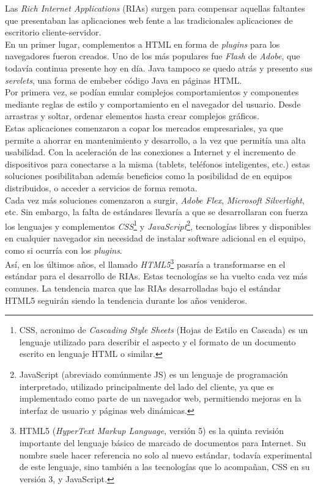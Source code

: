 Las \emph{Rich Internet Applications} (RIAs) surgen para compensar aquellas faltantes que
presentaban las aplicaciones web fente a las tradicionales aplicaciones de escritorio
cliente-servidor.\\
En un primer lugar, complementos a HTML en forma de \emph{plugins} para los navegadores
fueron creados. Uno de los más populares fue \emph{Flash} de \emph{Adobe}, que todavía
continua presente hoy en día. Java tampoco se quedo atrás y presento sus \emph{servlets},
una forma de embeber código Java en páginas HTML.\\
Por primera vez, se podían emular complejos comportamientos y componentes mediante
reglas de estilo y comportamiento en el navegador del usuario. Desde arrastras y soltar,
ordenar elementos hasta crear complejos gráficos.\\
Estas aplicaciones comenzaron a copar los mercados empresariales, ya que permite a ahorrar
en mantenimiento y desarrollo, a la vez que permitía una alta usabilidad. Con la aceleración
de las conexiones a Internet y el incremento de dispositivos para conectarse a la misma
(tablets, teléfonos inteligentes, etc.) estas soluciones posibilitaban además beneficios
como la posibilidad de en equipos distribuidos, o acceder a servicios de forma remota.\\
Cada vez más soluciones comenzaron a surgir, \emph{Adobe Flex}, \emph{Microsoft Silverlight},
etc. Sin embargo, la falta de estándares llevaría a que se desarrollaran con fuerza los
lenguajes y complementos \emph{CSS}\footnote{
	CSS, acronimo de \emph{\textsc{C}ascading \textsc{S}tyle \textsc{S}heets} (Hojas de
	Estilo en Cascada) es un lenguaje utilizado para describir el aspecto y el formato de un
	documento escrito en lenguaje HTML o similar.
} y \emph{JavaScript}\footnote{
	JavaScript (abreviado comúnmente JS) es un lenguaje de programación interpretado,
	utilizado principalmente del lado del cliente, ya que es implementado como parte de un
	navegador web, permitiendo mejoras en la interfaz de usuario y páginas web dinámicas.
}, tecnologías libres y disponibles en cualquier navegador sin necesidad de instalar
software adicional en el equipo, como si ocurría con los \emph{plugins}.\\
Así, en los últimos años, el llamado \emph{HTML5}\footnote{
	HTML5 (\emph{\textsc{H}yperText \textsc{M}arkup \textsc{L}anguage}, versión 5) es la quinta revisión importante del
	lenguaje básico de marcado de documentos para Internet. Su nombre suele hacer
	referencia no solo al nuevo estándar, todavía experimental de este lenguaje, sino
	también a las tecnologías que lo acompañan, CSS en su versión 3, y JavaScript.
} pasaría a transformarse en el estándar para el desarrollo de RIAs. Estas tecnologías
se ha vuelto cada vez más comunes. La tendencia marca que las RIAs desarrolladas bajo el
estándar HTML5 seguirán siendo la tendencia durante los años venideros.\\

